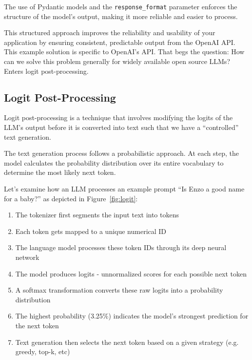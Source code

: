 The use of Pydantic models and the \texttt{response\_format} parameter enforces the structure of the model's output, making it more reliable and easier to process.

This structured approach improves the reliability and usability of your application by ensuring consistent, predictable output from the OpenAI API.
This example solution is specific to OpenAI's API. That begs the question: How can we solve this problem generally for widely available open source LLMs? Enters logit post-processing.

\subsection{Logit Post-Processing}

Logit post-processing is a technique that involves modifying the logits of the LLM's output before it is converted into text such that we have a ``controlled'' text generation.

The text generation process follows a probabilistic approach. At each step, the model calculates the probability distribution over its entire vocabulary to determine the most likely next token. 

Let's examine how an LLM processes an example prompt ``Is Enzo a good name for a baby?'' as depicted in Figure~\ref{fig:logit}:

\begin{enumerate}
    \item The tokenizer first segments the input text into tokens
    \item Each token gets mapped to a unique numerical ID
    \item The language model processes these token IDs through its deep neural network
    \item The model produces logits - unnormalized scores for each possible next token
    \item A softmax  transformation converts these raw logits into a probability distribution
    \item The highest probability (3.25\%) indicates the model's strongest prediction for the next token
    \item Text generation then selects the next token based on a given strategy (e.g. greedy, top-k, etc)
\end{enumerate}



